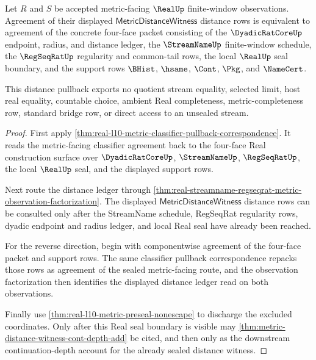 \begin{theorem}
\label{thm:real-l10-metric-distance-pullback-correspondence}
Let $R$ and $S$ be accepted metric-facing $\RealUp$ finite-window observations.
Agreement of their displayed $\mathsf{MetricDistanceWitness}$ distance rows is
equivalent to agreement of the concrete four-face packet consisting of the
$\DyadicRatCoreUp$ endpoint, radius, and distance ledger, the $\StreamNameUp$
finite-window schedule, the $\RegSeqRatUp$ regularity and common-tail rows, the
local $\RealUp$ seal boundary, and the support rows $\BHist$, $\hsame$, $\Cont$,
$\Pkg$, and $\NameCert$.

This distance pullback exports no quotient stream equality, selected limit,
host real equality, countable choice, ambient Real completeness,
metric-completeness row, standard bridge row, or direct access to an unsealed
stream.
\end{theorem}
\begin{proof}
First apply
\autoref{thm:real-l10-metric-classifier-pullback-correspondence}. It reads the
metric-facing classifier agreement back to the four-face Real construction
surface over $\DyadicRatCoreUp$, $\StreamNameUp$, $\RegSeqRatUp$, the local
$\RealUp$ seal, and the displayed support rows.

Next route the distance ledger through
\autoref{thm:real-streamname-regseqrat-metric-observation-factorization}. The
displayed $\mathsf{MetricDistanceWitness}$ distance rows can be consulted only
after the StreamName schedule, RegSeqRat regularity rows, dyadic endpoint and
radius ledger, and local Real seal have already been reached.

For the reverse direction, begin with componentwise agreement of the four-face
packet and support rows. The same classifier pullback correspondence repacks
those rows as agreement of the sealed metric-facing route, and the observation
factorization then identifies the displayed distance ledger read on both
observations.

Finally use \autoref{thm:real-l10-metric-preseal-nonescape} to discharge the
excluded coordinates. Only after this Real seal boundary is visible may
\autoref{thm:metric-distance-witness-cont-depth-add} be cited, and then only as
the downstream continuation-depth account for the already sealed distance
witness.
\end{proof}

